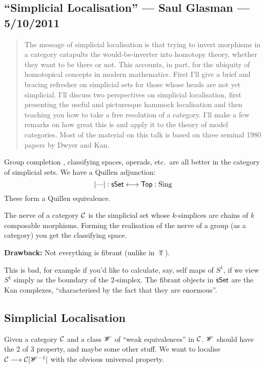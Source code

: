 \documentclass[11pt]{article}
\newcommand{\KanSemResponse}[1]
{
\thispagestyle{fancy}
\subsection*{#1}
}
\begin{document}
\begin{SaulSimplicialLocalisation}
\KanSemResponse
{``Simplicial Localisation'' --- Saul Glasman --- 5/10/2011}
\begin{abstract}
The message of simplicial localisation is that trying to invert 
morphisms in a category catapults the would-be-inverter into homotopy 
theory, whether they want to be there or not. This accounts, in part, 
for the ubiquity of homotopical concepts in modern mathematics. First 
I'll give a brief and bracing refresher on simplicial sets for those 
whose heads are not yet simplicial. I'll discuss two perspectives on 
simplicial localisation, first presenting the useful and picturesque 
hammock localisation and then teaching you how to take a free resolution 
of a category. I'll make a few remarks on how great this is and apply it 
to the theory of model categories. Most of the material on this talk is 
based on three seminal 1980 papers by Dwyer and Kan.
\end{abstract}
Group completion , classifying spaces, operads, etc.\ are all better in the category of simplicial sets. We have a Quillen adjunction:
\[|\textup{---}|:\operatorname{{\mathsf{sSet}}}\longleftrightarrow\operatorname{{\mathsf{Top}}}:\operatorname{Sing}\]
These form a Quillen equivalence.
\begin{exmp*}
The nerve of a category $\mathcal{C}$ is the simplicial set whose $k$-simplices are chains of $k$ composable morphisms. Forming the realisation of the nerve of a group (as a category) you get the classifying space.
\end{exmp*}
\textbf{Drawback:} Not everything is fibrant (unlike in $\Top$).

This is bad, for example if you'd like to calculate, say, self maps of $S^1$, if we view $S^1$ simply as the boundary of the $2$-simplex.
The fibrant objects in $\operatorname{{\mathsf{sSet}}}$ are the Kan complexes, ``characterised by the fact that they are enormous''.
\subsection*{Simplicial Localisation}
Given a category $\mathcal{C}$ and a class $\mathscr{W}$ of ``weak equivalences'' in $\mathcal{C}$. $\mathscr{W}$ should have the 2 of 3 property, and maybe some other stuff. We want to localise $\mathcal{C}\longrightarrow\mathcal{C}[\mathscr{W}^{-1}]$ with the obvious universal property.


\end{SaulSimplicialLocalisation}
\end{document}
